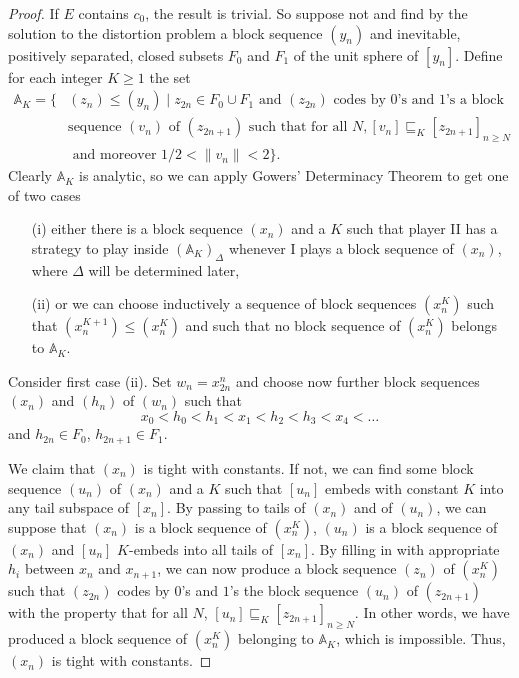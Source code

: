 \documentclass[10pt]{amsart}
\numberwithin{equation}{section}
\begin{document}
\begin{proof}
If $E$ contains $c_0$, the result is trivial. So suppose not and find by the
solution to the distortion problem a block sequence $(y_n)$ and inevitable,
positively separated, closed subsets $F_0$ and $F_1$ of the unit sphere of
$[y_n]$. Define for each integer $K{\ensuremath{\geqslant}} 1$ the set
\[\begin{split}
{\mathbb A}_K=\{& (z_n){\ensuremath{\leqslant}} (y_n){ \; \big| \;} z_{2n}\in F_0\cup F_1 \textrm{ and $(z_{2n})$ codes by $0$'s and $1$'s a block}\\
 &\textrm{sequence $(v_n)$ of $(z_{2n+1})$ such that for all }N, [v_n]\sqsubseteq_K [z_{2n+1}]_{n{\ensuremath{\geqslant}} N}\\
&\textrm { and moreover } 1/2<\|v_n\|<2\}.
\end{split}\]
Clearly ${\mathbb A}_K$ is analytic, so we can apply Gowers' Determinacy Theorem to get one of two cases
\begin{itemize}
  \item [(i)] either there is a block sequence $(x_n)$ and a $K$ such that player II has
  a strategy to play inside $({\mathbb A}_K)_\Delta$ whenever I plays a block
  sequence of $(x_n)$, where $\Delta$ will be determined later,
  \item [(ii)] or we can choose inductively a sequence of block sequences $(x_n^K)$ such
  that $(x_n^{K+1}){\ensuremath{\leqslant}} (x_n^K)$ and such that no block sequence of
  $(x_n^K)$ belongs to ${\mathbb A}_K$.
\end{itemize}

Consider first case (ii). Set $w_n=x^n_{2n}$ and choose now  further block
sequences $(x_n)$ and $(h_n)$ of $(w_n)$ such that
$$
x_0<h_0<h_1<x_1<h_2<h_3<x_4<\ldots
$$
and $h_{2n}\in F_0$, $h_{2n+1}\in F_1$.

We claim that $(x_n)$ is tight with constants. If not, we can find some block
sequence $(u_n)$ of $(x_n)$  and a $K$ such that $[u_n]$ embeds with constant
$K$ into any tail subspace of $[x_n]$. By passing to tails of $(x_n)$ and of
$(u_n)$, we can suppose that $(x_n)$ is a block sequence of $(x_n^{K})$,
$(u_n)$ is a block sequence of $(x_n)$ and $[u_n]$ $K$-embeds into all tails of
$[x_n]$. By filling in with appropriate $h_i$ between $x_n$ and $x_{n+1}$, we
can now produce a block sequence $(z_n)$ of $(x_n^{K})$ such that $(z_{2n})$
codes by $0$'s and $1$'s the block sequence $(u_n)$ of $(z_{2n+1})$ with the
property that for all $N$, $[u_n]\sqsubseteq_K [z_{2n+1}]_{n{\ensuremath{\geqslant}} N}$. In other
words, we have produced a block sequence of $(x_n^K)$ belonging to ${\mathbb A}_K$,
which is impossible. Thus, $(x_n)$ is tight with constants.


\end{proof}
\end{document}
